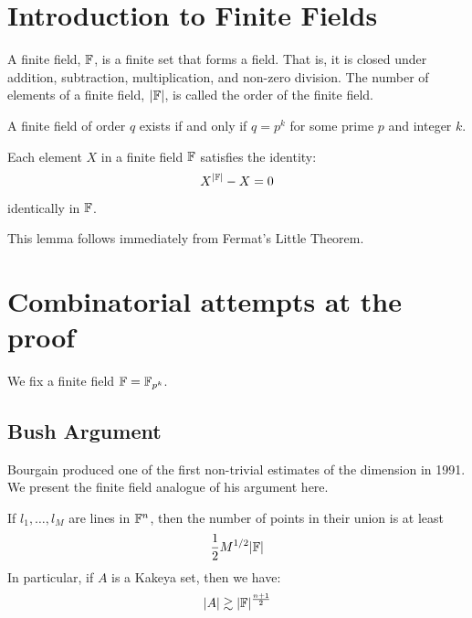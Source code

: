 \section{Introduction to Finite Fields}
\begin{definition}
    A finite field, $\mathbb F$, is a finite set that forms a field. That is, it is closed under addition, subtraction, multiplication, and non-zero division. 
    The number of elements of a finite field, $|\mathbb F|$, is called the order of the finite field.
\end{definition}
A finite field of order $q$ exists if and only if $q = p^k$ for some prime $p$ and integer $k$. 

\begin{lemma}
    Each element $X$ in a finite field $\mathbb F$ satisfies the identity:
    $$X^{|\mathbb F|} - X =0$$
    identically in $\mathbb F$.
    \label{lem:finite-fields-poly-identity}
\end{lemma}
This lemma follows immediately from Fermat's Little Theorem.




\section{Combinatorial attempts at the proof} 
We fix a finite field $\mathbb F = \mathbb F_{p^k}$.
\subsection{Bush Argument}
Bourgain produced one of the first non-trivial estimates of the dimension in 1991.\cite{BUSH1991} We present the finite field analogue of his argument here.\cite{GUTH2016}
\begin{theorem}
If $l_1, \dots, l_M$ are lines in $\mathbb F^n$, then the number of points in their union is at least 
$$\frac12 M^{1/2} |\mathbb F|$$
In particular, if $A$ is a Kakeya set, then we have:
$$|A| \gtrsim |\mathbb F|^{\frac{n+1}{2}}$$
\end{theorem}




